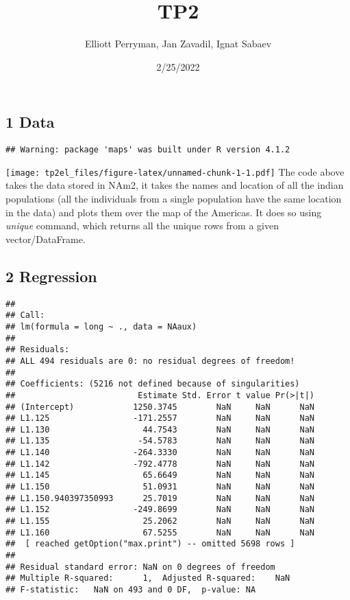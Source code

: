 \documentclass[
]{article}
\title{TP2}
\author{Elliott Perryman, Jan Zavadil, Ignat Sabaev}
\date{2/25/2022}
\begin{document}
\maketitle

\hypertarget{data}{%
\subsection{1 Data}\label{data}}

\begin{verbatim}
## Warning: package 'maps' was built under R version 4.1.2
\end{verbatim}

\texttt{[image: tp2el\_files/figure-latex/unnamed-chunk-1-1.pdf]} The
code above takes the data stored in NAm2, it takes the names and
location of all the indian populations (all the individuals from a
single population have the same location in the data) and plots them
over the map of the Americas. It does so using \emph{unique} command,
which returns all the unique rows from a given vector/DataFrame.

\hypertarget{regression}{%
\subsection{2 Regression}\label{regression}}

\begin{verbatim}
## 
## Call:
## lm(formula = long ~ ., data = NAaux)
## 
## Residuals:
## ALL 494 residuals are 0: no residual degrees of freedom!
## 
## Coefficients: (5216 not defined because of singularities)
##                         Estimate Std. Error t value Pr(>|t|)
## (Intercept)            1250.3745        NaN     NaN      NaN
## L1.125                 -171.2557        NaN     NaN      NaN
## L1.130                   44.7543        NaN     NaN      NaN
## L1.135                  -54.5783        NaN     NaN      NaN
## L1.140                 -264.3330        NaN     NaN      NaN
## L1.142                 -792.4778        NaN     NaN      NaN
## L1.145                   65.6649        NaN     NaN      NaN
## L1.150                   51.0931        NaN     NaN      NaN
## L1.150.940397350993      25.7019        NaN     NaN      NaN
## L1.152                 -249.8699        NaN     NaN      NaN
## L1.155                   25.2062        NaN     NaN      NaN
## L1.160                   67.5255        NaN     NaN      NaN
##  [ reached getOption("max.print") -- omitted 5698 rows ]
## 
## Residual standard error: NaN on 0 degrees of freedom
## Multiple R-squared:      1,  Adjusted R-squared:    NaN 
## F-statistic:   NaN on 493 and 0 DF,  p-value: NA
\end{verbatim}
\end{document}
